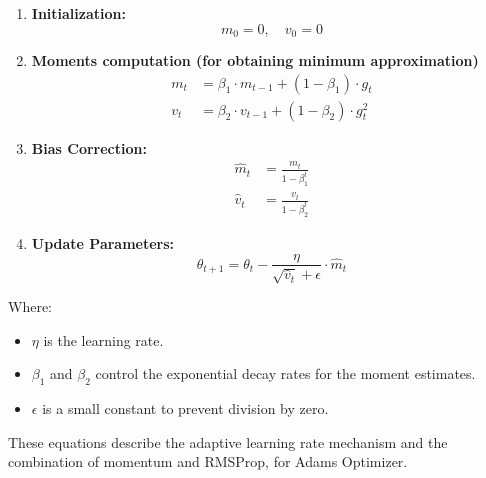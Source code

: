 \begin{enumerate}
    \item \textbf{Initialization:}
          \begin{equation}
              m_0 = 0, \quad v_0 = 0
          \end{equation}

    \item \textbf{Moments computation (for obtaining minimum approximation)}
          \begin{align}
              m_t & = \beta_1 \cdot m_{t-1} + (1 - \beta_1) \cdot g_t   \\
              v_t & = \beta_2 \cdot v_{t-1} + (1 - \beta_2) \cdot g_t^2
          \end{align}

    \item \textbf{Bias Correction:}
          \begin{align}
              \hat{m}_t & = \frac{m_t}{1 - \beta_1^t} \\
              \hat{v}_t & = \frac{v_t}{1 - \beta_2^t}
          \end{align}

    \item \textbf{Update Parameters:}
          \begin{equation}
              \theta_{t+1} = \theta_t - \frac{\eta}{\sqrt{\hat{v}_t} + \epsilon} \cdot \hat{m}_t
          \end{equation}
\end{enumerate}

Where:
\begin{itemize}
    \item \( \eta \) is the learning rate.
    \item \( \beta_1 \) and \( \beta_2 \) control the exponential decay rates for the moment estimates.
    \item \( \epsilon \) is a small constant to prevent division by zero.
\end{itemize}

\noindent These equations describe the adaptive learning rate mechanism and the combination of momentum and RMSProp, for Adams Optimizer.





